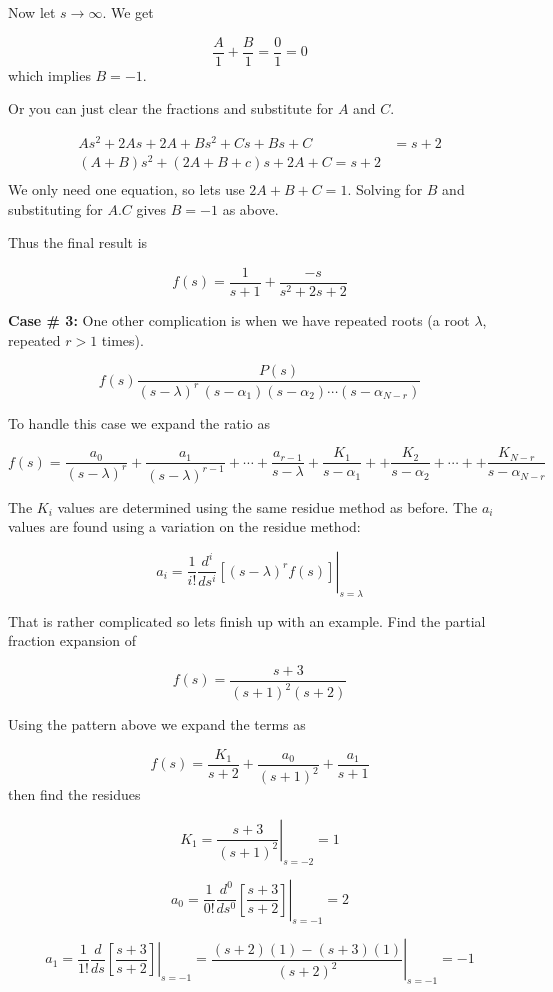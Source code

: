 \documentclass{article}
\begin{document}
Now let $s\rightarrow \infty$. We get

\[
\frac{A}{1} + \frac{B}{1} = \frac{0}{1} = 0
\]
which implies $B = -1$.

Or you can just clear the fractions and substitute for $A$ and $C$.

\begin{align}
  As^2 + 2As + 2A + Bs^2 + Cs + Bs + C &= s+2\\
  (A+B)s^2 + (2A + B + c)s + 2A +C = s+2\\
\end{align}
We only need one equation, so lets use $2A + B + C = 1$. Solving for $B$ and substituting for $A.C$ gives $B = -1$ as above.

Thus the final result is

\[
f(s) = \frac{1}{s+1} + \frac{-s}{s^2 + 2s + 2}
\]

\textbf{Case \# 3:} One other complication is when we have repeated roots (a root $\lambda$, repeated $r > 1$ times).

\[
f(s) \frac{P(s)}{(s-\lambda)^r\, (s-\alpha_1)(s-\alpha_2)\cdots(s-\alpha_{N-r})}
\]

To handle this case we expand the ratio as

\[
f(s) = \frac{a_0}{(s-\lambda)^r} + \frac{a_1}{(s-\lambda)^{r-1}} + \cdots + \frac{a_{r-1}}{s-\lambda} + \frac{K_1}{s-\alpha_1} + + \frac{K_2}{s-\alpha_2} + \cdots + + \frac{K_{N-r}}{s-\alpha_{N-r}} 
\]

The $K_i$ values are determined using the same residue method as before. The $a_i$ values are found using a variation on the residue method:

\[
a_i = \left. \frac{1}{i!}\frac{d^i}{ds^i}[(s-\lambda)^r f(s)] \right|_{s = \lambda}
\]

That is rather complicated so lets finish up with an example. Find the partial fraction expansion of

\[
f(s) = \frac{s+3}{(s+1)^2(s+2)}
\]

Using the pattern above we expand the terms as

\[
f(s) = \frac{K_1}{s+2} + \frac{a_0}{(s+1)^2} + \frac{a_1}{s+1}
\]
then find the residues

\[
K_1 = \left. \frac{s+3}{(s+1)^2} \right|_{s = -2} = 1
\]

\[
a_0 = \left. \frac{1}{0!}\frac{d^0}{ds^0}\left[\frac{s+3}{s+2}\right] \right|_{s = -1} = 2
\]

\[
a_1 = \left. \frac{1}{1!}\frac{d}{ds}\left[\frac{s+3}{s+2}\right] \right|_{s = -1} = \left. \frac{(s+2)(1) - (s+3)(1)}{(s+2)^2} \right|_{s = -1} = -1
\]
\end{document}
